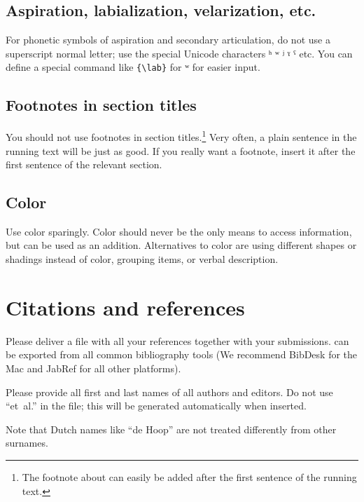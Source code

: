 \subsection{Aspiration, labialization, velarization, etc.}
For phonetic symbols of aspiration and secondary articulation, do not use a superscript normal letter; use the special Unicode characters ʰ ʷ ʲ ˠ ˤ etc. You can define a special command like \verb+{\lab}+ for ʷ for easier input. 

\subsection{Footnotes in section titles}\label{sec:footnote}
You should not use footnotes in section titles.\footnote{The footnote about  can easily be added after the first sentence of the running text.} Very often, a plain sentence in the running text will be just as good. If you really want a footnote, insert it after the first sentence of the relevant section.

\subsection{Color}
Use color sparingly. Color should never be the only means to access information, but can be used as an addition. 
Alternatives to color are using different shapes or shadings instead of color, grouping items, or verbal description. 




\section{Citations and references}
\label{sec-references-authors}

Please deliver a \BibTeX\xspace file with all your references together with your submissions. 
\BibTeX\xspace can be exported from all common bibliography tools (We recommend BibDesk for the Mac and JabRef for all other platforms). 

Please provide all first and last names of all authors and editors. Do not use ``et~al.''  in the \BibTeX\xspace file; this will be generated automatically when inserted.

 Note that Dutch names like ``de Hoop'' are not treated differently from other surnames.

